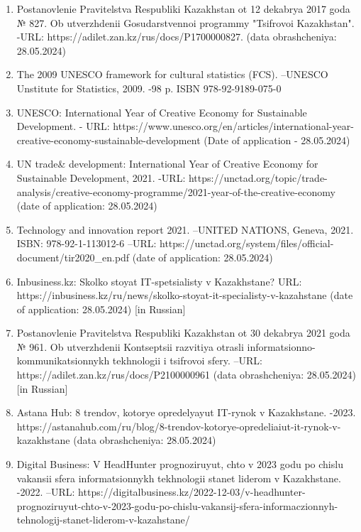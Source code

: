 \begin{enumerate}
\def\labelenumi{\arabic{enumi}.}
\item
  Postanovlenie Pravitel\textquotesingle stva Respubliki Kazakhstan ot
  12 dekabrya 2017 goda № 827. Ob utverzhdenii Gosudarstvennoi programmy
  "Tsifrovoi Kazakhstan". -URL:
  https://adilet.zan.kz/rus/docs/P1700000827. (data obrashcheniya:
  28.05.2024)
\item
  The 2009 UNESCO framework for cultural statistics (FCS). --UNESCO
  Unstitute for Statistics, 2009. -98 p. ISBN 978-92-9189-075-0
\item
  UNESCO: International Year of Creative Economy for Sustainable
  Development. - URL:
  https://www.unesco.org/en/articles/international-year-creative-economy-sustainable-development
  (Date of application - 28.05.2024)
\item
  UN trade\& development: International Year of Creative Economy for
  Sustainable Development, 2021. -URL:
  https://unctad.org/topic/trade-analysis/creative-economy-programme/2021-year-of-the-creative-economy
  (date of application: 28.05.2024)
\item
  Technology and innovation report 2021. --UNITED NATIONS, Geneva, 2021.
  ISBN: 978-92-1-113012-6 --URL:
  https://unctad.org/system/files/official-document/tir2020\_en.pdf
  (date of application: 28.05.2024)
\item
  Inbusiness.kz: Skol\textquotesingle ko stoyat IT-spetsialisty v
  Kazakhstane? URL:
  https://inbusiness.kz/ru/news/skolko-stoyat-it-specialisty-v-kazahstane
  (date of application: 28.05.2024) {[}in Russian{]}
\item
  Postanovlenie Pravitel\textquotesingle stva Respubliki Kazakhstan ot
  30 dekabrya 2021 goda № 961. Ob utverzhdenii Kontseptsii razvitiya
  otrasli informatsionno-kommunikatsionnykh tekhnologii i tsifrovoi
  sfery. --URL: https://adilet.zan.kz/rus/docs/P2100000961 (data
  obrashcheniya: 28.05.2024) {[}in Russian{]}
\item
  Astana Hub: 8 trendov, kotorye opredelyayut IT-rynok v Kazakhstane.
  -2023.
  https://astanahub.com/ru/blog/8-trendov-kotorye-opredeliaiut-it-rynok-v-kazakhstane
  (data obrashcheniya: 28.05.2024)
\item
  Digital Business: V HeadHunter prognoziruyut, chto v 2023 godu po
  chislu vakansii sfera informatsionnykh tekhnologii stanet liderom v
  Kazakhstane. -2022. --URL:
  https://digitalbusiness.kz/2022-12-03/v-headhunter-prognoziruyut-chto-v-2023-godu-po-chislu-vakansij-sfera-informaczionnyh-tehnologij-stanet-liderom-v-kazahstane/

\end{enumerate}
